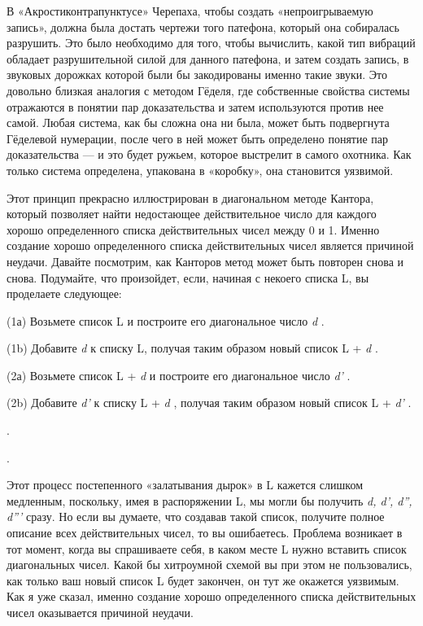 \documentclass[../main.tex]{subfiles}
\begin{document}
В «Акростиконтрапунктусе» Черепаха, чтобы создать «непроигрываемую запись», должна была достать чертежи того патефона, который она собиралась разрушить. Это было необходимо для того, чтобы вычислить, какой тип вибраций обладает разрушительной силой для данного патефона, и затем создать запись, в звуковых дорожках которой были бы закодированы именно такие звуки. Это довольно близкая аналогия с методом Гёделя, где собственные свойства системы отражаются в понятии пар доказательства и затем используются против нее самой. Любая система, как бы сложна она ни была, может быть подвергнута Гёделевой нумерации, после чего в ней может быть определено понятие пар доказательства --- и это будет ружьем, которое выстрелит в самого охотника. Как только система определена, упакована в «коробку», она становится уязвимой.

Этот принцип прекрасно иллюстрирован в диагональном методе Кантора, который позволяет найти недостающее действительное число для каждого хорошо определенного списка действительных чисел между 0 и 1. Именно создание хорошо определенного списка действительных чисел является причиной неудачи. Давайте посмотрим, как Канторов метод может быть повторен снова и снова. Подумайте, что произойдет, если, начиная с некоего списка L, вы проделаете следующее:

(1а) Возьмете список L и построите его диагональное число \emph{d} .

(1b) Добавите \emph{d} к списку L, получая таким образом новый список L + \emph{d} .

(2а) Возьмете список L + \emph{d} и построите его диагональное число \emph{d'} .

(2b) Добавите \emph{d'} к списку L + \emph{d} , получая таким образом новый список L + \emph{d'} .

.

.

Этот процесс постепенного «залатывания дырок» в L кажется слишком медленным, поскольку, имея в распоряжении L, мы могли бы получить \emph{d, d', d'', d'''} сразу. Но если вы думаете, что создавав такой список, получите полное описание всех действительных чисел, то вы ошибаетесь. Проблема возникает в тот момент, когда вы спрашиваете себя, в каком месте L нужно вставить список диагональных чисел. Какой бы хитроумной схемой вы при этом не пользовались, как только ваш новый список L будет закончен, он тут же окажется уязвимым. Как я уже сказал, именно создание хорошо определенного списка действительных чисел оказывается причиной неудачи.
\end{document}
